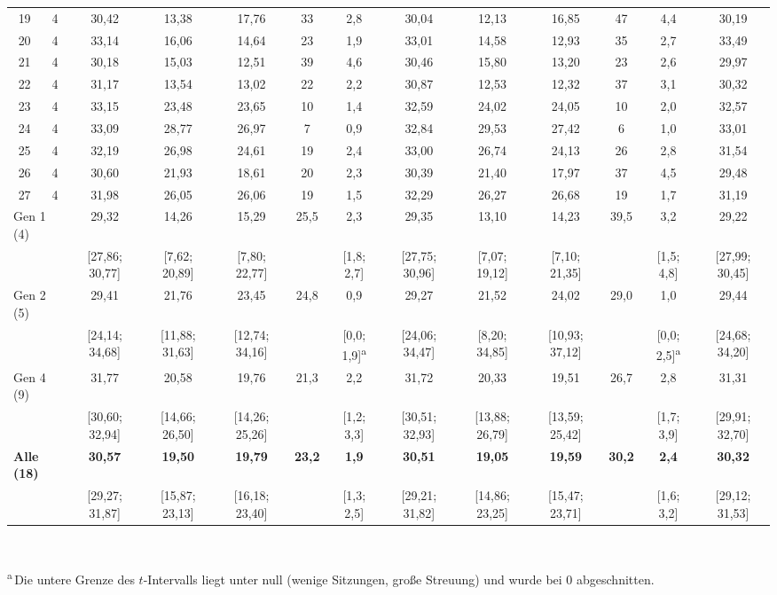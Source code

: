\begin{table}[htbp]
{\begin{tabular}{cc ccccc ccccc c}
    19 & 4 & 30,42 & 13,38 & 17,76 & 33 & 2,8 & 30,04 & 12,13 & 16,85 & 47 & 4,4 & 30,19 \\
    20 & 4 & 33,14 & 16,06 & 14,64 & 23 & 1,9 & 33,01 & 14,58 & 12,93 & 35 & 2,7 & 33,49 \\
    21 & 4 & 30,18 & 15,03 & 12,51 & 39 & 4,6 & 30,46 & 15,80 & 13,20 & 23 & 2,6 & 29,97 \\
    22 & 4 & 31,17 & 13,54 & 13,02 & 22 & 2,2 & 30,87 & 12,53 & 12,32 & 37 & 3,1 & 30,32 \\
    23 & 4 & 33,15 & 23,48 & 23,65 & 10 & 1,4 & 32,59 & 24,02 & 24,05 & 10 & 2,0 & 32,57 \\
    24 & 4 & 33,09 & 28,77 & 26,97 & 7 & 0,9 & 32,84 & 29,53 & 27,42 & 6 & 1,0 & 33,01 \\
    25 & 4 & 32,19 & 26,98 & 24,61 & 19 & 2,4 & 33,00 & 26,74 & 24,13 & 26 & 2,8 & 31,54 \\
    26 & 4 & 30,60 & 21,93 & 18,61 & 20 & 2,3 & 30,39 & 21,40 & 17,97 & 37 & 4,5 & 29,48 \\
    27 & 4 & 31,98 & 26,05 & 26,06 & 19 & 1,5 & 32,29 & 26,27 & 26,68 & 19 & 1,7 & 31,19 \\
    \midrule
    \multicolumn{2}{l}{Gen 1 (4)} & 29,32 & 14,26 & 15,29 & 25,5 & 2,3 & 29,35 & 13,10 & 14,23 & 39,5 & 3,2 & 29,22 \\
      & & [27,86; 30,77] & [7,62; 20,89] & [7,80; 22,77] & & [1,8; 2,7] & [27,75; 30,96] & [7,07; 19,12] & [7,10; 21,35] & & [1,5; 4,8] & [27,99; 30,45] \\
    \multicolumn{2}{l}{Gen 2 (5)} & 29,41 & 21,76 & 23,45 & 24,8 & 0,9 & 29,27 & 21,52 & 24,02 & 29,0 & 1,0 & 29,44 \\
      & & [24,14; 34,68] & [11,88; 31,63] & [12,74; 34,16] & & [0,0; 1,9]\textsuperscript{a} & [24,06; 34,47] & [8,20; 34,85] & [10,93; 37,12] & & [0,0; 2,5]\textsuperscript{a} & [24,68; 34,20] \\
    \multicolumn{2}{l}{Gen 4 (9)} & 31,77 & 20,58 & 19,76 & 21,3 & 2,2 & 31,72 & 20,33 & 19,51 & 26,7 & 2,8 & 31,31 \\
      & & [30,60; 32,94] & [14,66; 26,50] & [14,26; 25,26] & & [1,2; 3,3] & [30,51; 32,93] & [13,88; 26,79] & [13,59; 25,42] & & [1,7; 3,9] & [29,91; 32,70] \\
    \midrule
    \multicolumn{2}{l}{\textbf{Alle (18)}} & \textbf{30,57} & \textbf{19,50} & \textbf{19,79} & \textbf{23,2} & \textbf{1,9} & \textbf{30,51} & \textbf{19,05} & \textbf{19,59} & \textbf{30,2} & \textbf{2,4} & \textbf{30,32} \\
      & & [29,27; 31,87] & [15,87; 23,13] & [16,18; 23,40] & & [1,3; 2,5] & [29,21; 31,82] & [14,86; 23,25] & [15,47; 23,71] & & [1,6; 3,2] & [29,12; 31,53] \\
    \bottomrule
  \end{tabular}}\\[1mm]
  \parbox{0.95\linewidth}{\footnotesize \textsuperscript{a}\,Die untere Grenze
  des $t$-Intervalls liegt unter null (wenige Sitzungen, große Streuung) und
  wurde bei 0 abgeschnitten.}
\end{table}

